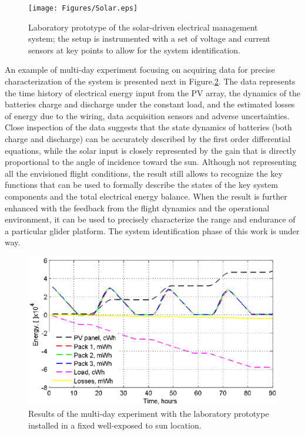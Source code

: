 \documentclass{ifacconf}
\begin{document}
\begin{figure}[thpb]
  \centering
  \texttt{[image: Figures/Solar.eps]}
  \caption{Laboratory prototype of the solar-driven electrical management system; the setup is
  instrumented with a set of voltage and current sensors at key points to allow for the system identification.}
  \label{fig:Solar_arch}
\end{figure}

An example of multi-day experiment focusing on acquiring data for precise
characterization of the system is presented next in Figure.\ref{fig:MultiDay_enrg}. The
data represents the time history of electrical energy input from the PV array, the
dynamics of the batteries charge and discharge under the constant load, and the estimated
losses of energy due to the wiring, data acquisition sensors and adverse uncertainties.
Close inspection of the data suggests that the state dynamics of batteries (both charge
and discharge) can be accurately described by the first order differential equations,
while the solar input is closely represented by the gain that is directly proportional to
the angle of incidence toward the sun. Although not representing all the envisioned
flight conditions, the result still allows to recognize the key functions that can be
used to formally describe the states of the key system components and the total
electrical energy balance. When the result is further enhanced with the feedback from the
flight dynamics and the operational environment, it can be used to precisely characterize
the range and endurance of a particular glider platform. The system identification phase
of this work is under way.
\begin{figure}[thpb]
  \centering
  \includegraphics[scale=0.62]{Figures/MultiDay_energy.eps}
  \caption{Results of the multi-day experiment with the laboratory prototype installed in a fixed
  well-exposed to sun location.}
  \label{fig:MultiDay_enrg}
\end{figure}
\end{document}
